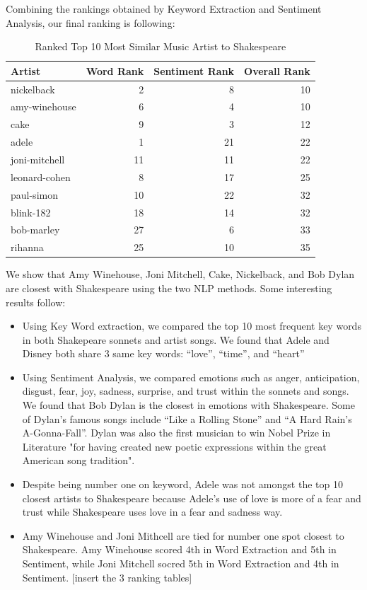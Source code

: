 \documentclass[10pt,a4paper]{article}
\begin{document}
Combining the rankings obtained by Keyword Extraction and Sentiment Analysis, our final ranking is following:

\begin{table}[ht]
\centering
\begin{tabular}{lrrr}
  \hline
Artist & Word Rank & Sentiment Rank & Overall Rank \\ 
  \hline
nickelback &   2 &   8 &  10 \\ 
  amy-winehouse &   6 &   4 &  10 \\ 
  cake &   9 &   3 &  12 \\ 
  adele &   1 &  21 &  22 \\ 
  joni-mitchell &  11 &  11 &  22 \\ 
  leonard-cohen &   8 &  17 &  25 \\ 
  paul-simon &  10 &  22 &  32 \\ 
  blink-182 &  18 &  14 &  32 \\ 
  bob-marley &  27 &   6 &  33 \\ 
  rihanna &  25 &  10 &  35 \\ 
   \hline
\end{tabular}
\caption{Ranked Top 10 Most Similar Music Artist to Shakespeare} 
\label{tab:overallranktable}
\end{table}


We show that Amy Winehouse, Joni Mitchell, Cake, Nickelback, and Bob Dylan are closest with Shakespeare using the two NLP methods. Some interesting results follow:

\begin{itemize}

\item Using Key Word extraction, we compared the top 10 most frequent key words in both Shakepeare sonnets and artist songs. We found that Adele and Disney both share 3 same key words: “love”, “time”, and “heart”
\item Using Sentiment Analysis, we compared emotions such as anger, anticipation, disgust, fear, joy, sadness, surprise, and trust within the sonnets and songs. We found that Bob Dylan is the closest in emotions with Shakespeare. Some of Dylan’s famous songs include “Like a Rolling Stone” and “A Hard Rain’s A-Gonna-Fall”. Dylan was also the first musician to win Nobel Prize in Literature "for having created new poetic expressions within the great American song tradition".
\item Despite being number one on keyword, Adele was not amongst the top 10 closest artists to Shakespeare because Adele’s use of love is more of a fear and trust while Shakespeare uses love in a fear and sadness way.
\item Amy Winehouse and Joni Mithcell are tied for number one spot closest to Shakespeare. Amy Winehouse scored 4th in Word Extraction and 5th in Sentiment, while Joni Mitchell socred 5th in Word Extraction and 4th in Sentiment.  [insert the 3 ranking tables]

\end{itemize}
\end{document}
